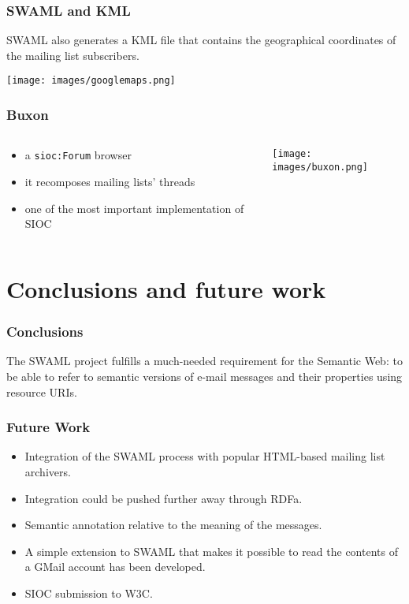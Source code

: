 \documentclass[spanish,notes=hide,16pt]{beamer}
\begin{document}
\frame
{
  \frametitle{SWAML and KML}

  SWAML also generates a KML file that contains the geographical coordinates 
  of the mailing list subscribers.

  \begin{center}
    \texttt{[image: images/googlemaps.png]}
  \end{center}
}
\frame
{
  \frametitle{Buxon}

  \begin{columns}
   \begin{column}{0.32\textwidth}
	\begin{itemize}
	  \item a \texttt{sioc:Forum} browser
	  \item it recomposes mailing lists' threads
	  \item one of the most important implementation of SIOC
	\end{itemize}
   \end{column}
   \begin{column}{0.68\textwidth}
	\texttt{[image: images/buxon.png]}
   \end{column}
  \end{columns}
}

\section{Conclusions and future work}
\frame
{
  \frametitle{Conclusions}

  \begin{Large}
    The SWAML project fulfills a much-needed requirement for the Semantic Web: 
    to be able to refer to semantic versions of e-mail messages and their properties 
    using resource URIs.
  \end{Large}
}
\frame
{
  \frametitle{Future Work}

  \begin{itemize}
   \item \begin{Large}Integration of the SWAML process with popular HTML-based mailing list archivers.\end{Large}
   \item \begin{Large}Integration could be pushed further away through RDFa.\end{Large}
   \item \begin{Large}Semantic annotation relative to the meaning of the messages.\end{Large}
   \item \begin{Large}A simple extension to SWAML that makes it possible to read the contents of a GMail account has 
		been developed.\end{Large}
   \item \begin{Large}SIOC submission to W3C.\end{Large}
  \end{itemize}
}
\end{document}
